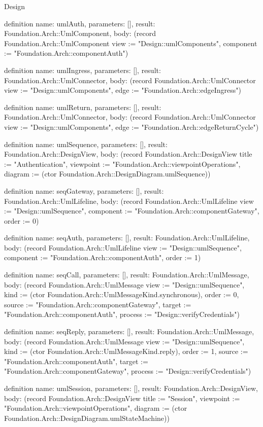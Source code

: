 \begin{lexlean}{Design}
\begin{semanticmodule}
definition{
  name: umlAuth,
  parameters: [],
  result: Foundation.Arch::UmlComponent,
  body: (record Foundation.Arch::UmlComponent {view := "Design::umlComponents", component := "Foundation.Arch::componentAuth"})
}

definition{
  name: umlIngress,
  parameters: [],
  result: Foundation.Arch::UmlConnector,
  body: (record Foundation.Arch::UmlConnector {view := "Design::umlComponents", edge := "Foundation.Arch::edgeIngress"})
}

definition{
  name: umlReturn,
  parameters: [],
  result: Foundation.Arch::UmlConnector,
  body: (record Foundation.Arch::UmlConnector {view := "Design::umlComponents", edge := "Foundation.Arch::edgeReturnCycle"})
}

definition{
  name: umlSequence,
  parameters: [],
  result: Foundation.Arch::DesignView,
  body: (record Foundation.Arch::DesignView {title := "Authentication", viewpoint := "Foundation.Arch::viewpointOperations", diagram := (ctor Foundation.Arch::DesignDiagram.umlSequence)})
}

definition{
  name: seqGateway,
  parameters: [],
  result: Foundation.Arch::UmlLifeline,
  body: (record Foundation.Arch::UmlLifeline {view := "Design::umlSequence", component := "Foundation.Arch::componentGateway", order := 0})
}

definition{
  name: seqAuth,
  parameters: [],
  result: Foundation.Arch::UmlLifeline,
  body: (record Foundation.Arch::UmlLifeline {view := "Design::umlSequence", component := "Foundation.Arch::componentAuth", order := 1})
}

definition{
  name: seqCall,
  parameters: [],
  result: Foundation.Arch::UmlMessage,
  body: (record Foundation.Arch::UmlMessage {view := "Design::umlSequence", kind := (ctor Foundation.Arch::UmlMessageKind.synchronous), order := 0, source := "Foundation.Arch::componentGateway", target := "Foundation.Arch::componentAuth", process := "Design::verifyCredentials"})
}

definition{
  name: seqReply,
  parameters: [],
  result: Foundation.Arch::UmlMessage,
  body: (record Foundation.Arch::UmlMessage {view := "Design::umlSequence", kind := (ctor Foundation.Arch::UmlMessageKind.reply), order := 1, source := "Foundation.Arch::componentAuth", target := "Foundation.Arch::componentGateway", process := "Design::verifyCredentials"})
}

definition{
  name: umlSession,
  parameters: [],
  result: Foundation.Arch::DesignView,
  body: (record Foundation.Arch::DesignView {title := "Session", viewpoint := "Foundation.Arch::viewpointOperations", diagram := (ctor Foundation.Arch::DesignDiagram.umlStateMachine)})
}


\end{semanticmodule}
\end{lexlean}
